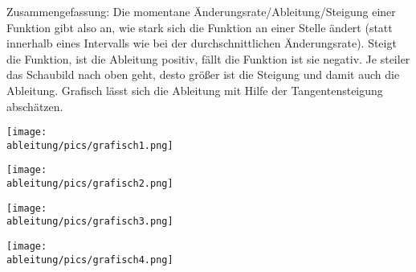 Zusammengefassung: Die momentane Änderungsrate/Ableitung/Steigung einer Funktion gibt also an, wie stark sich die Funktion an einer Stelle ändert (statt innerhalb eines Intervalls wie bei der durchschnittlichen Änderungsrate). Steigt die Funktion, ist die Ableitung positiv, fällt die Funktion ist sie negativ. Je steiler das Schaubild nach oben geht, desto größer ist die Steigung und damit auch die Ableitung. Grafisch lässt sich die Ableitung mit Hilfe der Tangentensteigung abschätzen.
\newpage
\begin{Exercise}[title={\raggedright Schätze jeweils die Ableitung an den Stellen -2, 0, 1 und 3 ab.}, label=grafischABlA1]

    \begin{minipage}{\textwidth}
		\begin{minipage}{\textwidth}
			\begin{minipage}{0.5\textwidth}
				\centering\texttt{[image: \\ableitung/pics/grafisch1.png]}
			\end{minipage}%
			\begin{minipage}{0.5\textwidth}
				\centering\texttt{[image: \\ableitung/pics/grafisch2.png]}
			\end{minipage}%
		\end{minipage}%

        \bigskip

		\begin{minipage}{\textwidth}
			\begin{minipage}{0.5\textwidth}
				\centering\texttt{[image: \\ableitung/pics/grafisch3.png]}
			\end{minipage}%
			\begin{minipage}{0.5\textwidth}
				\centering\texttt{[image: \\ableitung/pics/grafisch4.png]}
			\end{minipage}%
		\end{minipage}%
    \end{minipage}
\end{Exercise}
